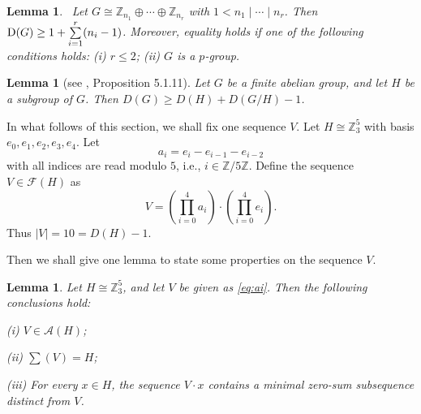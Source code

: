 \documentclass[a4paper, 12pt]{article}
\newtheorem{lemma}[theorem]{Lemma}
\begin{document}
\begin{lemma} \cite{EmdeBoas007, Olson1}\label{Lemma Davenport precise value} \ Let $G\cong \mathbb{Z}_{n_1}\oplus \cdots  \oplus \mathbb{Z}_{n_r}$ with $1< n_1 \mid\cdots\mid n_r$. Then
${\rm D}(G)\geq 1 +\sum\limits_{i=1}^r (n_i-1)$. Moreover, equality holds if one of the following conditions holds:
(i) $r\leq 2$; (ii) $G$ is a $p$-group.
\end{lemma}


\begin{lemma} [see \cite{GH}, Proposition 5.1.11] \label{Lemma:DavenportOfQuotient}  Let $G$ be a finite abelian group, and let $H$ be a subgroup of $G$.
Then $D(G)\geq  D(H)+D(G/H)-1$.
\end{lemma}

In what follows of this section, we shall fix one sequence $V$.
Let $H\cong\mathbb{Z}_3^5$ with basis $e_0,e_1,e_2,e_3,e_4$.   Let
\begin{equation}\label{eq:ai}
 a_i=e_i-e_{i-1}-e_{i-2}
\end{equation}
with all indices are read modulo $5$,  i.e., $i\in\mathbb Z/5\mathbb Z$. Define the sequence $V\in \mathcal{F}(H)$ as
\begin{equation}\label{eq:V}
 V=(\prod_{i=0}^{4} a_i)\cdot (\prod_{i=0}^{4}e_i).
\end{equation}
Thus $|V|=10=D(H)-1$.

Then we shall give one lemma to state some properties on the sequence $V$.

\begin{lemma}\label{Lemma:Vatom} Let $H\cong \mathbb{Z}_3^5$, and let $V$ be given as \eqref{eq:ai}. Then the following conclusions hold:

(i) $V\in \mathcal A(H)$;

(ii) $\sum(V)=H$;

(iii)  For every $x\in H$, the sequence $V\cdot x$ contains a minimal zero-sum
subsequence distinct from $V$.
\end{lemma}
\end{document}
